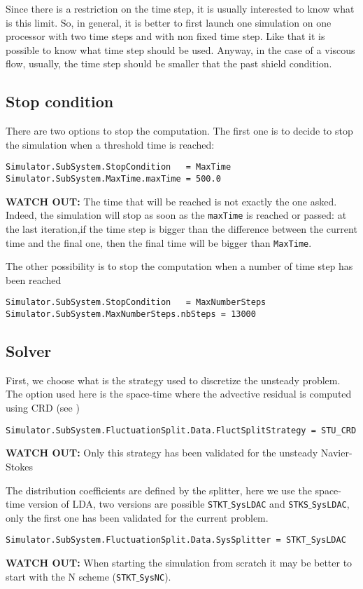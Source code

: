 \documentclass[11pt]{article}
\begin{document}
Since there is a restriction on the time step, it is usually interested to know
what is this limit. So, in general, it is better to first launch one simulation on one processor with two time steps
and with non fixed time step. Like that it is possible to know what time step should be used. Anyway, in the case of
a viscous flow, usually, the time step should be smaller that the past shield condition.

\subsection{Stop condition}
There are two options to stop the computation. The first one is to
decide to stop the simulation when a threshold time is reached: 
\begin{verbatim}
Simulator.SubSystem.StopCondition   = MaxTime
Simulator.SubSystem.MaxTime.maxTime = 500.0
\end{verbatim}
{\bf WATCH OUT:} The time that will be reached is not exactly the one asked. Indeed, the simulation will stop
as soon as the \texttt{maxTime} is reached or passed: at the last iteration,if the time step is bigger than the difference between the current 
time and the final one, then the final time will be bigger than \texttt{MaxTime}.


The other possibility is to stop the computation when a number of time step
has been reached
\begin{verbatim}
Simulator.SubSystem.StopCondition   = MaxNumberSteps
Simulator.SubSystem.MaxNumberSteps.nbSteps = 13000
\end{verbatim}



\subsection{Solver}

First, we choose what is the strategy used to discretize the unsteady problem.
The option used here is the space-time where the advective residual is computed using CRD (see \cite{mr-thesis}) 
\begin{verbatim}
Simulator.SubSystem.FluctuationSplit.Data.FluctSplitStrategy = STU_CRD	
\end{verbatim}
{\bf WATCH OUT:} Only this strategy has been validated for the unsteady Navier-Stokes

The distribution coefficients are defined by the splitter, here we use the space-time version 
of LDA, two versions are possible \texttt{STKT$\_$SysLDAC} and \texttt{STKS$\_$SysLDAC}, only the first
one has been validated for the current problem.
\begin{verbatim}
Simulator.SubSystem.FluctuationSplit.Data.SysSplitter = STKT_SysLDAC
\end{verbatim}
{\bf WATCH OUT:} When starting the simulation from scratch it may be better to start with the N scheme (\texttt{STKT$\_$SysNC}).\\
\end{document}
